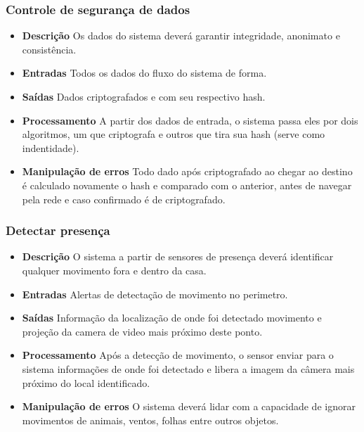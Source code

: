 \subsubsection{Controle de segurança de dados}
\begin{itemize}

	\item \textbf{Descrição}
	Os dados do sistema deverá garantir integridade, anonimato e consistência.

	\item \textbf{Entradas}
    Todos os dados do fluxo do sistema de forma.

	\item \textbf{Saídas}
	Dados criptografados e com seu respectivo hash.

	\item \textbf{Processamento}
	A partir dos dados de entrada, o sistema passa eles por dois algoritmos, um que criptografa e outros que tira sua
	hash (serve como indentidade).

	\item \textbf{Manipulação de erros}
	Todo dado após criptografado ao chegar ao destino é calculado novamente o hash e comparado com o anterior, antes
	de navegar pela rede e caso confirmado é de criptografado.

\end{itemize}

\subsubsection{Detectar presença}
\begin{itemize}

	\item \textbf{Descrição}
	O sistema a partir de sensores de presença deverá identificar qualquer movimento fora e dentro da casa.

	\item \textbf{Entradas}
	Alertas de detectação de movimento no perimetro.

	\item \textbf{Saídas}
	Informação da localização de onde foi detectado movimento e projeção da camera de video mais próximo deste ponto.

	\item \textbf{Processamento}
	Após a detecção de movimento, o sensor enviar para o sistema informações de onde foi detectado e libera a imagem
	da câmera mais próximo do local identificado.

	\item \textbf{Manipulação de erros}
	O sistema deverá lidar com a capacidade de ignorar movimentos de animais, ventos, folhas entre outros objetos.

\end{itemize}

